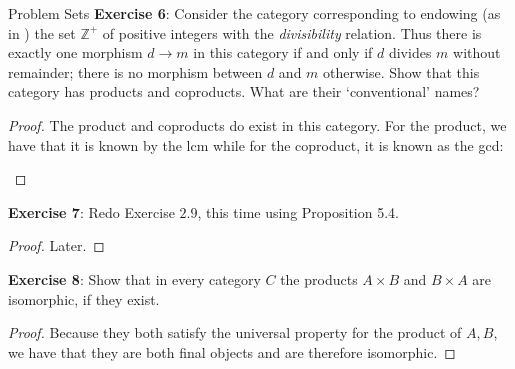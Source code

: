 \documentclass{report}
\begin{document}
\begin{exercises}{Problem Sets}
    \textbf{Exercise 6}: Consider the category corresponding to endowing (as in ) the set $\mathbb{Z}^{+}$ of positive integers with the \textit{divisibility} relation. Thus there is exactly one morphism $d \rightarrow m$ in this category if and only if $d$ divides $m$ without remainder; there is no morphism between $d$ and $m$ otherwise. Show that this category has products and coproducts. What are their `conventional' names?
        \begin{proof}
            The product and coproducts do exist in this category. For the product, we have that it is known by the lcm while for the coproduct, it is known as the gcd:
                \begin{center}
                \end{center}
                \begin{center}
                \end{center}
        \end{proof}
    \textbf{Exercise 7}: Redo Exercise $2.9$, this time using Proposition 5.4.
        \begin{proof}
            Later.
        \end{proof}

    \textbf{Exercise 8}: Show that in every category $C$ the products $A \times B$ and $B \times A$ are isomorphic, if they exist.
        \begin{proof}
            Because they both satisfy the universal property for the product of $A, B$, we have that they are both final objects and are therefore isomorphic.
        \end{proof}


\end{exercises}
\end{document}
